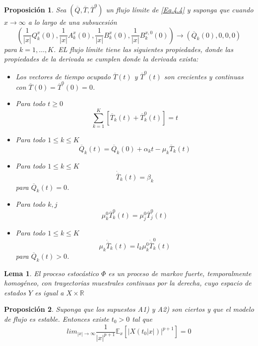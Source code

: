 \documentclass{article}
\newtheorem{Prop}{Proposición}[section]
\newtheorem{Lemma}{Lema}[section]
\newcommand{\rea}{\mathbb{R}}
\newcommand{\esp}{\mathbb{E}}
\numberwithin{equation}{section}
\begin{document}
\begin{Prop}
 Sea $\left(\overline{Q},\overline{T},\overline{T}^{0}\right)$ un flujo l\'imite de \ref{Eq.4.4} y suponga que cuando $x\rightarrow\infty$ a lo largo de
una subsucesi\'on
\[\left(\frac{1}{|x|}Q_{k}^{x}\left(0\right),\frac{1}{|x|}A_{k}^{x}\left(0\right),\frac{1}{|x|}B_{k}^{x}\left(0\right),\frac{1}{|x|}B_{k}^{x,0}\left(0\right)\right)\rightarrow\left(\overline{Q}_{k}\left(0\right),0,0,0\right)\]
para $k=1,\ldots,K$. EL flujo l\'imite tiene las siguientes
propiedades, donde las propiedades de la derivada se cumplen donde
la derivada exista:
\begin{itemize}
 \item[i)] Los vectores de tiempo ocupado $\overline{T}\left(t\right)$ y $\overline{T}^{0}\left(t\right)$ son crecientes y continuas con
$\overline{T}\left(0\right)=\overline{T}^{0}\left(0\right)=0$.
\item[ii)] Para todo $t\geq0$
\[\sum_{k=1}^{K}\left[\overline{T}_{k}\left(t\right)+\overline{T}_{k}^{0}\left(t\right)\right]=t\]
\item[iii)] Para todo $1\leq k\leq K$
\[\overline{Q}_{k}\left(t\right)=\overline{Q}_{k}\left(0\right)+\alpha_{k}t-\mu_{k}\overline{T}_{k}\left(t\right)\]
\item[iv)]  Para todo $1\leq k\leq K$
\[\dot{{\overline{T}}}_{k}\left(t\right)=\beta_{k}\] para $\overline{Q}_{k}\left(t\right)=0$.
\item[v)] Para todo $k,j$
\[\mu_{k}^{0}\overline{T}_{k}^{0}\left(t\right)=\mu_{j}^{0}\overline{T}_{j}^{0}\left(t\right)\]
\item[vi)]  Para todo $1\leq k\leq K$
\[\mu_{k}\dot{{\overline{T}}}_{k}\left(t\right)=l_{k}\mu_{k}^{0}\dot{{\overline{T}}}_{k}^{0}\left(t\right)\] para $\overline{Q}_{k}\left(t\right)>0$.
\end{itemize}
\end{Prop}


\begin{Lemma}\label{Lema.34.MeynDown}
El proceso estoc\'astico $\Phi$ es un proceso de markov fuerte,
temporalmente homog\'eneo, con trayectorias muestrales continuas
por la derecha, cuyo espacio de estados $Y$ es igual a
$X\times\rea$
\end{Lemma}
\begin{Prop}
 Suponga que los supuestos A1) y A2) son ciertos y que el modelo de flujo es estable. Entonces existe $t_{0}>0$ tal que
\begin{equation}
 lim_{|x|\rightarrow\infty}\frac{1}{|x|^{p+1}}\esp_{x}\left[|X\left(t_{0}|x|\right)|^{p+1}\right]=0
\end{equation}
\end{Prop}
\end{document}
